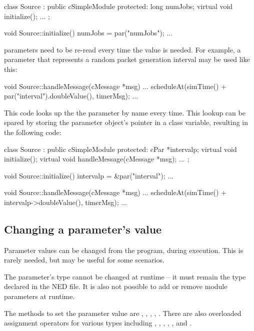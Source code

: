 \begin{cpp}
class Source : public cSimpleModule
{
  protected:
    long numJobs;
    virtual void initialize();
    ...
};

void Source::initialize()
{
    numJobs = par("numJobs");
    ...
}
\end{cpp}

 parameters need to be re-read every time the value is needed.
For example, a parameter that represents a random packet generation interval
may be used like this:

\begin{cpp}
void Source::handleMessage(cMessage *msg)
{
    ...
    scheduleAt(simTime() + par("interval").doubleValue(), timerMsg);
    ...
}
\end{cpp}

This code looks up the the parameter by name every time. This lookup
can be spared by storing the parameter object's pointer in a class variable,
resulting in the following code:

\begin{cpp}
class Source : public cSimpleModule
{
  protected:
    cPar *intervalp;
    virtual void initialize();
    virtual void handleMessage(cMessage *msg);
    ...
};

void Source::initialize()
{
    intervalp = &par("interval");
    ...
}

void Source::handleMessage(cMessage *msg)
{
    ...
    scheduleAt(simTime() + intervalp->doubleValue(), timerMsg);
    ...
}
\end{cpp}


\subsection{Changing a parameter's value}
\label{sec:simple-modules:setting-parameters}

Parameter values can be changed from the program, during execution.
This is rarely needed, but may be useful for some scenarios.

\begin{note}
    The parameter's type cannot be changed at runtime -- it must
    remain the type declared in the NED file. It is also not possible
    to add or remove module parameters at runtime.
\end{note}

The methods to set the parameter value are ,
, ,
, . There are also
overloaded assignment operators for various types including ,
, , , , and
.

